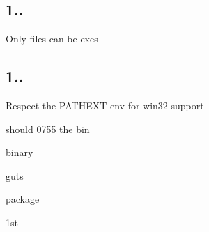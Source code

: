 \subsection*{1..}


\begin{DoxyItemize}
\item Only files can be exes
\end{DoxyItemize}

\subsection*{1..}


\begin{DoxyItemize}
\item Respect the P\+A\+T\+H\+E\+XT env for win32 support
\item should 0755 the bin
\item binary
\item guts
\item package
\item 1st 
\end{DoxyItemize}